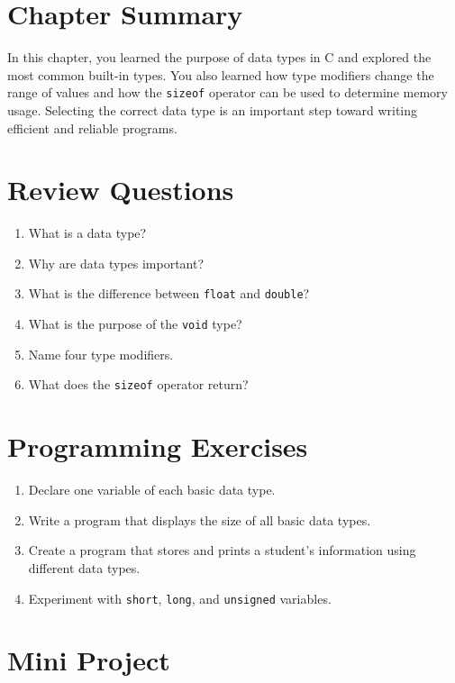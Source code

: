 \documentclass[12pt,openany]{book}
\begin{document}
\section{Chapter Summary}

In this chapter, you learned the purpose of data types in C and explored the most common built-in types. You also learned how type modifiers change the range of values and how the \texttt{sizeof} operator can be used to determine memory usage. Selecting the correct data type is an important step toward writing efficient and reliable programs.

\section{Review Questions}

\begin{enumerate}
    \item What is a data type?
    \item Why are data types important?
    \item What is the difference between \texttt{float} and \texttt{double}?
    \item What is the purpose of the \texttt{void} type?
    \item Name four type modifiers.
    \item What does the \texttt{sizeof} operator return?
\end{enumerate}

\section{Programming Exercises}

\begin{enumerate}
    \item Declare one variable of each basic data type.
    \item Write a program that displays the size of all basic data types.
    \item Create a program that stores and prints a student's information using different data types.
    \item Experiment with \texttt{short}, \texttt{long}, and \texttt{unsigned} variables.
\end{enumerate}

\section{Mini Project}
\end{document}
